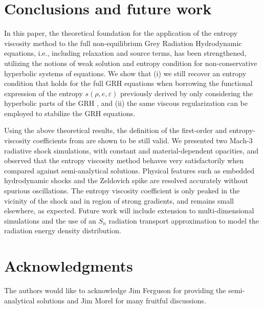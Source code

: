 \documentclass[times,doublespace]{fldauth}%
\begin{document}
\section{Conclusions and future work}
In this paper, the theoretical foundation for the application of the entropy viscosity method to the full non-equilibrium Grey Radiation Hydrodynamic equations, i.e., including relaxation and source terms, has been strengthened, utilizing the notions of weak solution and entropy condition for non-conservative hyperbolic systems of equations. We show that 
(i) we still recover an entropy condition that holds for the full GRH equations when borrowing the functional expression of the entropy  $s(\rho,e,\varepsilon)$ previously derived by only considering the hyperbolic parts of the GRH \cite{our_jcp_radhy_paper}, and
(ii) the same viscous regularization can be employed to stabilize the GRH equations.

Using the above theoretical results, the definition of the first-order and entropy-viscosity coefficients from \cite{our_jcp_radhy_paper} are shown to be still valid. We presented two Mach-3 radiative shock simulations, with constant and material-dependent opacities, and observed that the entropy viscosity method behaves very satisfactorily when compared against semi-analytical solutions. Physical features such as embedded hydrodynamic shocks and the Zeldovich spike are resolved accurately without spurious oscillations. The entropy viscosity coefficient is only peaked in the vicinity of the shock and in region of strong gradients, and remains small elsewhere, as expected. 
%
Future work will include extension to multi-dimensional simulations and the use of an $S_n$ radiation transport approximation to model the radiation energy density distribution.



\section*{Acknowledgments}
The authors would like to acknowledge Jim Ferguson for providing the semi-analytical solutions and Jim Morel for many fruitful discussions. 




\end{document}
